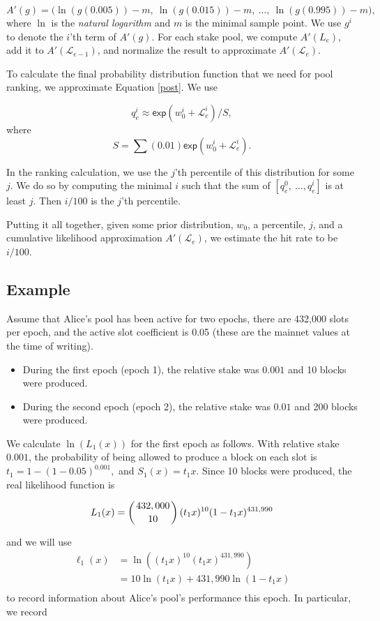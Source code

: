 \documentclass[11pt,a4paper,dvipsnames,twosided]{article}
\begin{document}
\[ A'(g) = \big(\ln(g(0.005)) - m,~ \ln(g(0.015)) - m,~ \ldots,~ \ln(g(0.995)) - m\big), \]
where $\ln$ is the \emph{natural logarithm} and $m$ is the minimal sample point. We use $g^i$ to denote the $i$'th term of $A'(g)$.
For each stake pool, we compute $A'(L_e)$, add it to $A'(\mathcal{L}_{e-1})$, and
normalize the result to approximate $A'(\mathcal{L}_e)$.

To calculate the final probability distribution function that we need for pool ranking, we approximate Equation \eqref{post}. We use

\[ q_e^i \approx \mathsf{exp}(w_0^i + \mathcal{L}_e^i) / S, \]
where
\[ S = \sum (0.01) \mathsf{exp}(w_0^i + \mathcal{L}_e^i). \]

In the ranking calculation, we use the $j$'th percentile of this distribution for some $j$.
We do so by computing the minimal $i$ such that the sum of $[q_e^0,~\ldots,q_e^i]$ is at least $j$.
Then $i/100$ is the $j$'th percentile.

Putting it all together, given some prior distribution, $w_0$, a percentile, $j$, and a cumulative likelihood approximation
$A'(\mathcal{L}_e)$, we estimate the hit rate to be $i/100$.


\subsection{Example}

Assume that Alice's pool has been active for two epochs,
there are 432,000 slots per epoch, and the active slot coefficient is 0.05
(these are the mainnet values at the time of writing).
\begin{itemize}
\item
  During the first epoch (epoch 1), the relative stake was $0.001$ and 10 blocks were produced.
\item
  During the second epoch (epoch 2), the relative stake was $0.01$ and 200 blocks were produced.
\end{itemize}
We calculate $\ln(L_1(x))$ for the first epoch as follows.
%
With relative stake $0.001$, the probability of being allowed to produce a block on
each slot is $t_1 = 1-(1-0.05)^{0.001},$ and $S_1(x)= t_1x$.
Since 10 blocks were produced, the real likelihood function is

\[ L_1(x) =  \left( 432,000 \atop 10 \right) (t_1x)^{10} (1-t_1x)^{431,990} \]

and we will use
\[
\begin{array}{rl}
  \ell_1(x) &= \ln\left( (t_1x)^{10} (t_1x)^{431,990} \right) \\
            &= 10 \ln(t_1 x) + 431,990 \ln(1 - t_1 x) \\
\end{array}
\]
to record information about Alice's pool's performance this epoch.
In particular, we record
\end{document}
